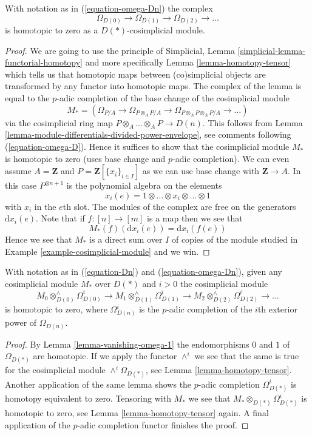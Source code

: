 \begin{lemma}
\label{lemma-vanishing-omega-1}
With notation as in (\ref{equation-omega-Dn}) the complex
$$
\Omega_{D(0)} \to \Omega_{D(1)} \to \Omega_{D(2)} \to \ldots
$$
is homotopic to zero as a $D(*)$-cosimplicial module.
\end{lemma}

\begin{proof}
We are going to use the principle of
Simplicial, Lemma \ref{simplicial-lemma-functorial-homotopy}
and more specifically
Lemma \ref{lemma-homotopy-tensor}
which tells us that homotopic maps between (co)simplicial objects
are transformed by any functor into homotopic maps.
The complex of the lemma is equal to the $p$-adic completion of the
base change of the cosimplicial module
$$
M_* = \left(
\Omega_{P/A} \to
\Omega_{P \otimes_A P/A} \to
\Omega_{P \otimes_A P \otimes_A P/A} \to \ldots
\right)
$$
via the cosimplicial ring map $P\otimes_A \ldots \otimes_A P \to D(n)$. This
follows from Lemma \ref{lemma-module-differentials-divided-power-envelope},
see comments following (\ref{equation-omega-D}). Hence it
suffices to show that the cosimplicial module $M_*$ is homotopic to zero
(uses base change and $p$-adic completion).
We can even assume $A = \mathbf{Z}$ and $P = \mathbf{Z}[\{x_i\}_{i \in I}]$
as we can use base change with $\mathbf{Z} \to A$.
In this case $P^{\otimes n + 1}$ is the polynomial algebra on the elements
$$
x_i(e) = 1 \otimes \ldots \otimes x_i \otimes \ldots \otimes 1
$$
with $x_i$ in the $e$th slot. The modules of the complex are free on the
generators $\text{d}x_i(e)$. Note that if $f : [n] \to [m]$ is a
map then we see that
$$
M_*(f)(\text{d}x_i(e)) = \text{d}x_i(f(e))
$$
Hence we see that $M_*$ is a direct sum over $I$ of copies of the module
studied in Example \ref{example-cosimplicial-module} and we win.
\end{proof}

\begin{lemma}
\label{lemma-vanishing}
With notation as in (\ref{equation-Dn}) and (\ref{equation-omega-Dn}),
given any cosimplicial module $M_*$ over $D(*)$ and
$i > 0$ the cosimplicial module
$$
M_0 \otimes^\wedge_{D(0)} \Omega^i_{D(0)} \to
M_1 \otimes^\wedge_{D(1)} \Omega^i_{D(1)} \to
M_2 \otimes^\wedge_{D(2)} \Omega^i_{D(2)} \to \ldots
$$
is homotopic to zero, where $\Omega^i_{D(n)}$ is the $p$-adic completion
of the $i$th exterior power of $\Omega_{D(n)}$.
\end{lemma}

\begin{proof}
By Lemma \ref{lemma-vanishing-omega-1} the endomorphisms $0$ and $1$
of $\Omega_{D(*)}$ are homotopic.
If we apply the functor $\wedge^i$ we see that
the same is true for the cosimplicial module $\wedge^i\Omega_{D(*)}$, see
Lemma \ref{lemma-homotopy-tensor}.
Another application of the same lemma shows the $p$-adic completion
$\Omega^i_{D(*)}$ is homotopy equivalent to zero.
Tensoring with $M_*$ we see that $M_* \otimes_{D(*)} \Omega^i_{D(*)}$
is homotopic to zero, see Lemma \ref{lemma-homotopy-tensor} again.
A final application of the $p$-adic completion functor finishes the proof.
\end{proof}




